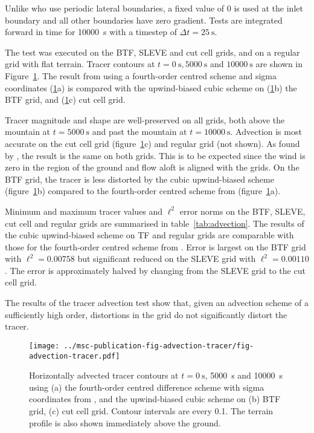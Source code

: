 \documentclass[twocol]{ametsoc}
\begin{document}
Unlike \citet{schaer2002} who use periodic lateral boundaries, a fixed value of 0 is used at the inlet boundary and all other boundaries have zero gradient.
Tests are integrated forward in time for \SI{10000}{\second} with a timestep of \(\Delta t = \SI{25}{\second}\).

The test was executed on the BTF, SLEVE and cut cell grids, and on a regular grid with flat terrain.  Tracer contours at \(t = \SI{0}{\second}, \SI{5000}{\second}\) and \(\SI{10000}{\second}\) are shown in Figure~\ref{fig:advection-tracer}.  The result from \citet{schaer2002} using a fourth-order centred scheme and sigma coordinates (\ref{fig:advection-tracer}a) is compared with the upwind-biased cubic scheme on (\ref{fig:advection-tracer}b) the BTF grid, and (\ref{fig:advection-tracer}c) cut cell grid.

Tracer magnitude and shape are well-preserved on all grids, both above the mountain at \(t = \SI{5000}{\second}\) and past the mountain at \(t = \SI{10000}{\second}\).  Advection is most accurate on the cut cell grid (figure~\ref{fig:advection-tracer}c) and regular grid (not shown).  As found by \citet{good2014}, the result is the same on both grids.  This is to be expected since the wind is zero in the region of the ground and flow aloft is aligned with the grids.  On the BTF grid, the tracer is less distorted by the cubic upwind-biased scheme (figure~\ref{fig:advection-tracer}b) compared to the fourth-order centred scheme from \citet{schaer2002} (figure~\ref{fig:advection-tracer}a).

Minimum and maximum tracer values and \(\ell^2\) error norms on the BTF, SLEVE, cut cell and regular grids are summarised in table~\ref{tab:advection}.  The results of the cubic upwind-biased scheme on TF and regular grids are comparable with those for the fourth-order centred scheme from \citet{schaer2002}.  Error is largest on the BTF grid with \(\ell^2 = \num{0.00758}\) but significant reduced on the SLEVE grid with \(\ell^2 = \num{0.00110}\).  The error is approximately halved by changing from the SLEVE grid to the cut cell grid.

The results of the tracer advection test show that, given an advection scheme of a sufficiently high order, distortions in the grid do not significantly distort the tracer.

\begin{figure}
	\centering
	\texttt{[image: ../msc-publication-fig-advection-tracer/fig-advection-tracer.pdf]}
%
	\caption{Horizontally advected tracer contours at \(t = \SI{0}{\second}\), \SI{5000}{\second} and \SI{10000}{\second} using (a) the fourth-order centred difference scheme with sigma coordinates from \citet{schaer2002}, and the upwind-biased cubic scheme on (b) BTF grid, (c) cut cell grid.  Contour intervals are every 0.1.  The terrain profile is also shown immediately above the ground.}
	\label{fig:advection-tracer}
\end{figure}
\end{document}
